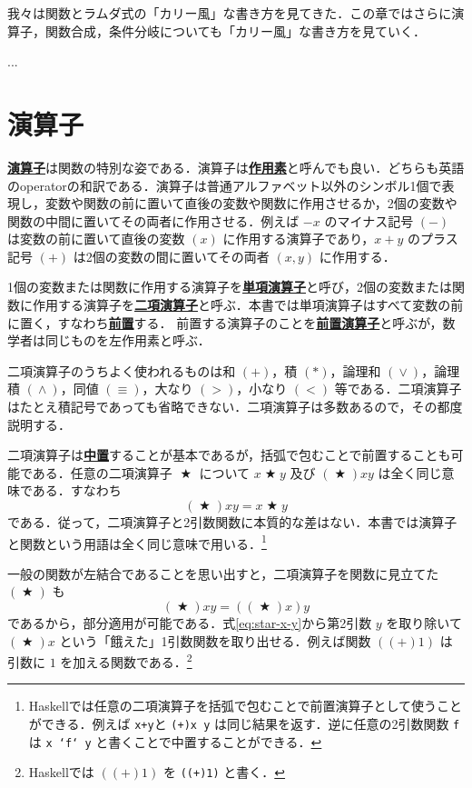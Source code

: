 \documentclass[a4paper,twocolumn]{jsbook}
\newcommand{\programminglanguage}[1]{\textsf{#1}}
\newcommand{\haskell}{\programminglanguage{Haskell}}
\newenvironment{leader}{\begingroup\gt}{\endgroup}
\newcommand{\keyword}[1]{{\underline{\textbf{#1}}}}
\newcommand{\code}[1]{\texttt{#1}}
\DeclareMathOperator{\mBinOp}{\bigstar}
\DeclareMathOperator{\mLogicalAnd}{\wedge}
\DeclareMathOperator{\mLogicalOr}{\vee}
\begin{document}
\begin{leader}
我々は関数とラムダ式の「カリー風」な書き方を見てきた．この章ではさらに演算子，関数合成，条件分岐についても「カリー風」な書き方を見ていく．

...
\end{leader}

\section{演算子}

\keyword{演算子}は関数の特別な姿である．演算子は\keyword{作用素}と呼んでも良い．どちらも英語のoperatorの和訳である．演算子は普通アルファベット以外のシンボル1個で表現し，変数や関数の前に置いて直後の変数や関数に作用させるか，2個の変数や関数の中間に置いてその両者に作用させる．例えば $-x$ のマイナス記号 $(-)$ は変数の前に置いて直後の変数 $(x)$ に作用する演算子であり，$x+y$ のプラス記号 $(+)$ は2個の変数の間に置いてその両者 $(x,y)$ に作用する．

1個の変数または関数に作用する演算子を\keyword{単項演算子}と呼び，2個の変数または関数に作用する演算子を\keyword{二項演算子}と呼ぶ．本書では単項演算子はすべて変数の前に置く，すなわち\keyword{前置}する．
前置する演算子のことを\keyword{前置演算子}と呼ぶが，数学者は同じものを左作用素と呼ぶ．

二項演算子のうちよく使われるものは和 $(+)$，積 $(*)$，論理和 $(\mLogicalOr)$，論理積 $(\mLogicalAnd)$，同値 $(\equiv)$，大なり $(>)$，小なり $(<)$ 等である．二項演算子はたとえ積記号であっても省略できない．二項演算子は多数あるので，その都度説明する．

二項演算子は\keyword{中置}することが基本であるが，括弧で包むことで前置することも可能である．任意の二項演算子 $\mBinOp$ について $x\mBinOp y$ 及び $(\mBinOp)xy$ は全く同じ意味である．すなわち
\begin{equation}
\left(\mBinOp\right)xy=x\mBinOp y
\end{equation}
である．従って，二項演算子と2引数関数に本質的な差はない．本書では演算子と関数という用語は全く同じ意味で用いる．\footnote{\haskell では任意の二項演算子を括弧で包むことで前置演算子として使うことができる．例えば \code{x+y}と \code{(+)x y} は同じ結果を返す．逆に任意の2引数関数 \code{f}は \code{x `f` y} と書くことで中置することができる．}

一般の関数が左結合であることを思い出すと，二項演算子を関数に見立てた $(\mBinOp)$ も
\begin{equation}
\label{eq:star-x-y}
(\mBinOp)xy=((\mBinOp)x)y
\end{equation}
であるから，部分適用が可能である．式\eqref{eq:star-x-y}から第2引数 $y$ を取り除いて $(\mBinOp)x$ という「餓えた」1引数関数を取り出せる．例えば関数 $((+)1)$ は引数に $1$ を加える関数である．\footnote{\haskell では $((+)1)$ を \code{((+)1)} と書く．}
\end{document}
